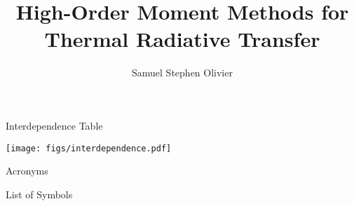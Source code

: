\documentclass[todo]{dissertation}
\begin{document}
\title{High-Order Moment Methods for Thermal Radiative Transfer}
\author{Samuel Stephen Olivier}
\maketitle

\copyrightpage

\begin{abstract}

\end{abstract}

\begin{frontmatter}

\begin{KeepFromToc}
\tableofcontents
\end{KeepFromToc}
\clearpage

\begin{preamble}{Interdependence Table}
\vfill
\begin{center}
\label{preamble:interdependence}
\texttt{[image: figs/interdependence.pdf]}
\end{center}
\end{preamble}

\begin{preamble}{Acronyms}
\printglossary[style=april_gloss_style]
\end{preamble}

\begin{preamble}{List of Symbols}

\end{preamble}


\begin{preamble}{\acknowledgename}

\end{preamble}
\end{frontmatter}

\glsresetall %









\glsresetall %

\clearpage
\printbibliography
\appendix 

\end{document}
